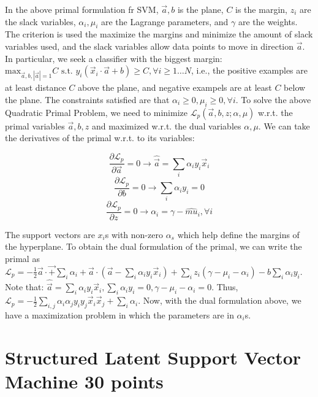 \documentclass[10pt,onecolumn,letterpaper]{article}
\begin{document}
\begin{enumerate}
In the above primal formulation fr SVM, $\vec a, b$ is the plane, $C$ is the margin, $z_{i}$ are the slack variables, $\alpha_i, \mu_i$ are the Lagrange parameters, and $\gamma$ are the weights. The criterion is used the maximize the margins and minimize the amount of slack variables used, and the slack variables allow data points to move in direction $\vec a$. In particular, we seek a classifier with the biggest margin: $\text{max}_{\vec a, b, |\vec a|=1} C \text{ s.t. } y_{i}(\vec x_{i}\cdot\vec a + b) \geq C, \forall i \geq 1\dots N $, i.e., the positive examples are at least distance $C$ above the plane, and negative exampels are at least $C$ below the plane. The constraints satisfied are that $\alpha_i \geq 0, \mu_i \geq 0, \forall i$. To solve the above Quadratic Primal Problem, we need to minimize $\mathcal{L}_p(\vec a, b, z; \alpha, \mu)$ w.r.t. the primal variables $\vec a, b, z$ and maximized w.r.t. the dual variables $\alpha, \mu$. We can take the derivatives of the primal w.r.t. to its variables:

$$ \frac{\partial \mathcal{L}_p}{\partial \vec a} = 0 \rightarrow \widehat{\vec{a}} = \sum_i \alpha_iy_i\vec{x}_i $$
$$ \frac{\partial \mathcal{L}_p}{\partial b} = 0 \rightarrow \sum_i \alpha_iy_i = 0 $$
$$ \frac{\partial \mathcal{L}_p}{\partial z} = 0 \rightarrow \alpha_i = \gamma - \widehat{mu}_i, \forall i $$

The support vectors are $x_i$s with non-zero $\alpha_s$ which help define the margins of the hyperplane. To obtain the dual formulation of the primal, we can write the primal as $\mathcal{L}_p = -\frac{1}{2}\vec a \cdot \vec + \sum_i \alpha_i + \vec a \cdot (\vec a - \sum_i \alpha_iy_i\vec{x}_i) + \sum_i z_i(\gamma - \mu_i - \alpha_i) - b\sum_i\alpha_iy_i$. Note that: $\widehat{\vec{a}} = \sum_i \alpha_iy_i\vec{x}_i, \sum_i \alpha_iy_i=0, \gamma-\mu_i-\alpha_i=0$. Thus, $\mathcal{L}_p = -\frac{1}{2}\sum_{i,j}\alpha_i\alpha_jy_iy_j\vec{x}_i\vec{x}_j+\sum_i\alpha_i$. Now, with the dual formulation above, we have a maximization problem in which the parameters are in $\alpha_i$s.


\end{enumerate}

\section*{Structured Latent Support Vector Machine 30 points}
\end{document}
